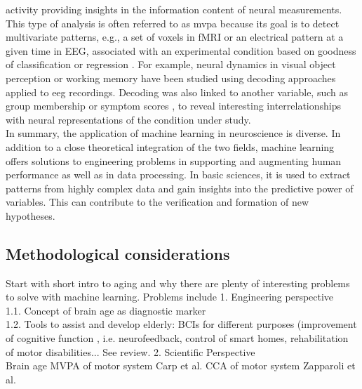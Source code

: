 activity providing insights in the information content of neural measurements. This type of analysis is often referred to as \gls{mvpa} because its goal is to detect multivariate patterns, e.g., a set of voxels in fMRI or an electrical pattern at a given time in EEG, associated with an experimental condition based on goodness of classification or regression \cite{Holdgraf2017}. For example, neural dynamics in visual object perception \cite{Cauchoix2014} or working memory \cite{Bae2018} have been studied using decoding approaches applied to \gls{eeg} recordings. Decoding was also linked to another variable, such as group membership \cite{Csizmadia2021, Bae2020} or symptom scores \cite{Coutanche2011} , to reveal interesting interrelationships with neural representations of the condition under study.\\
In summary, the application of machine learning in neuroscience is diverse. In addition to a close theoretical integration of the two fields, machine learning offers solutions to engineering problems in supporting and augmenting human performance as well as in data processing. In basic sciences, it is used to extract patterns from highly complex data and gain insights into the predictive power of variables. This can contribute to the verification and formation of new hypotheses.


\subsection{Methodological considerations}
Start with short intro to aging and why there are plenty of interesting problems to solve with machine learning. Problems include
1. Engineering perspective\\
1.1. Concept of brain age as diagnostic marker\\  
1.2. Tools to assist and develop elderly: BCIs for different purposes (improvement of cognitive function  , i.e. neurofeedback, control of smart homes, rehabilitation of motor disabilities... See review. 
2. Scientific Perspective\\
Brain age 
MVPA of motor system Carp et al. 
CCA of motor system Zapparoli et al.




